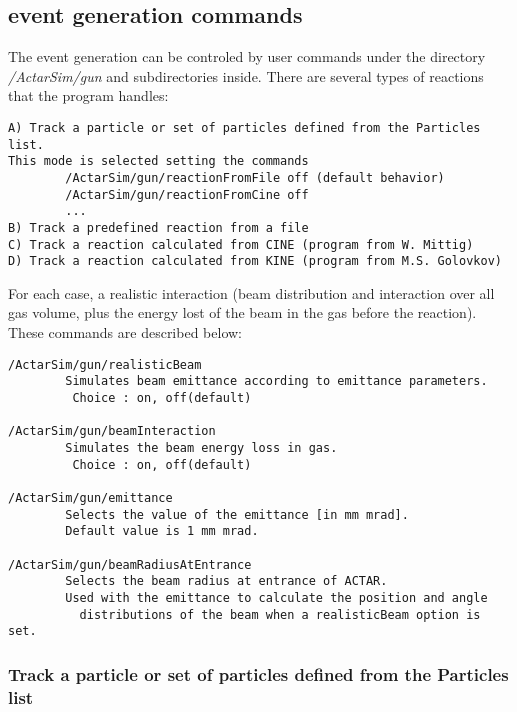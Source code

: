 \subsection{event generation commands}

The event generation can be controled by user commands under the directory \textit{/ActarSim/gun} and subdirectories inside. There are several types of reactions that the program handles:

\begin{verbatim}
A) Track a particle or set of particles defined from the Particles list. 
This mode is selected setting the commands 
        /ActarSim/gun/reactionFromFile off (default behavior)
        /ActarSim/gun/reactionFromCine off 
        ...
B) Track a predefined reaction from a file 
C) Track a reaction calculated from CINE (program from W. Mittig)
D) Track a reaction calculated from KINE (program from M.S. Golovkov)
\end{verbatim}

For each case, a realistic interaction (beam distribution and interaction over all gas volume, plus the energy lost of the beam in the gas before the reaction). These commands are described below:

\begin{verbatim}
/ActarSim/gun/realisticBeam
        Simulates beam emittance according to emittance parameters.
         Choice : on, off(default)

/ActarSim/gun/beamInteraction
        Simulates the beam energy loss in gas.
         Choice : on, off(default)

/ActarSim/gun/emittance
        Selects the value of the emittance [in mm mrad].  
        Default value is 1 mm mrad. 

/ActarSim/gun/beamRadiusAtEntrance
        Selects the beam radius at entrance of ACTAR.
        Used with the emittance to calculate the position and angle
          distributions of the beam when a realisticBeam option is set.
\end{verbatim}

\subsubsection{Track a particle or set of particles defined from the Particles list}

